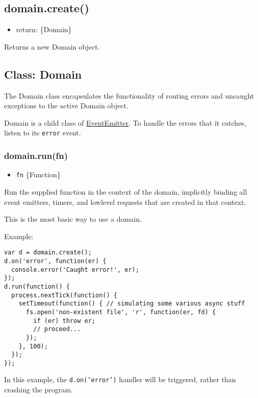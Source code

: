 \subsection{domain.create()}\label{domain.create}

\begin{itemize}
\itemsep1pt\parskip0pt
\item
  return: \{Domain\}
\end{itemize}

Returns a new Domain object.

\subsection{Class: Domain}\label{class-domain}

The Domain class encapsulates the functionality of routing errors and
uncaught exceptions to the active Domain object.

Domain is a child class of
\href{events.html\#events_class_events_eventemitter}{EventEmitter}. To
handle the errors that it catches, listen to its \texttt{error} event.

\subsubsection{domain.run(fn)}\label{domain.runfn}

\begin{itemize}
\itemsep1pt\parskip0pt
\item
  \texttt{fn} \{Function\}
\end{itemize}

Run the supplied function in the context of the domain, implicitly
binding all event emitters, timers, and lowlevel requests that are
created in that context.

This is the most basic way to use a domain.

Example:

\begin{verbatim}
var d = domain.create();
d.on('error', function(er) {
  console.error('Caught error!', er);
});
d.run(function() {
  process.nextTick(function() {
    setTimeout(function() { // simulating some various async stuff
      fs.open('non-existent file', 'r', function(er, fd) {
        if (er) throw er;
        // proceed...
      });
    }, 100);
  });
});
\end{verbatim}

In this example, the \texttt{d.on('error')} handler will be triggered,
rather than crashing the program.

